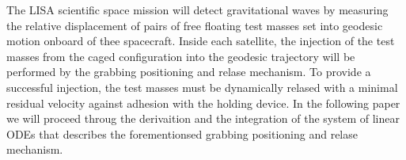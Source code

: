 The LISA scientific space mission will detect gravitational waves by measuring the relative displacement of pairs of free floating test masses set into geodesic motion onboard of thee spacecraft. Inside each satellite, the injection of the test masses from the caged configuration into the geodesic trajectory will be performed by the grabbing positioning and relase mechanism. To provide a successful injection, the test masses must be dynamically relased with a minimal residual velocity against adhesion with the holding device.
In the following paper we will proceed throug the derivaition and the integration of the system of linear ODEs that describes the forementionsed grabbing positioning and relase mechanism.